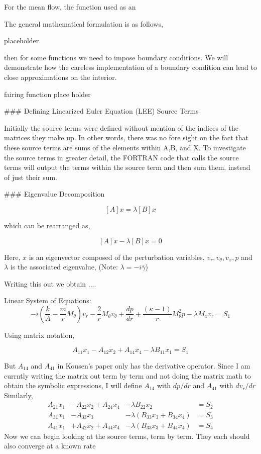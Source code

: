 For the mean flow, the function used as an

The general mathematical formulation is as follows,

placeholder

then for some functions we need to impose boundary conditions. We will demonstrate how the careless implementation of a boundary condition can lead to close approximations on the interior.

fairing function place holder 

### Defining Linearized Euler Equation (LEE) Source Terms

Initially the source terms were defined without mention of the indices of the matrices they make up. In other words, there was no fore sight on the fact that these source terms are sums 
of the elements within A,B, and X. To investigate the source terms in greater detail, the FORTRAN code that calls the source terms will output the terms within the source term and then sum them, instead of just their sum.

### Eigenvalue Decomposition


$$ [A]{x} = \lambda [B] {x} $$

which can be rearranged as,

$$ [A]{x} - \lambda [B] {x} = 0$$

Here, $x$ is an eigenvector composed of the perturbation variables, $v_r,v_{\theta},v_x,p$ and $\lambda$ is the associated eigenvalue, (Note: $\lambda = -i \bar{\gamma}$)

Writing this out we obtain ....

Linear System of Equations:
\begin{equation}
-
i \left(
\frac{k}{A} - \frac{m}{r} M_{\theta}
\right)
v_r 
-
\frac{2}{r} M_{\theta} v_{\theta} 
+
\frac{dp}{dr} 
+
\frac{(\kappa - 1)}{r} M_{\theta}^2 p
-
\lambda M_x v_r =S_1
\end{equation}

Using matrix notation,

\begin{equation}
A_{11}
x_1 
-
A_{12} x_2 
+
A_{14} x_4
-
\lambda B_{11} x_1 = S_1
\end{equation}

But $A_{14}$ and $A_{41}$ in Kousen's paper only has the derivative operator. Since I am currntly writing the matrix out term by term and not doing the matrix math to obtain the symbolic expressions, I will define $A_{14}$ with $dp/dr$ and $A_{41}$ with $dv_r/dr$
Similarly,
\begin{align}
A_{21} x_1 &-
A_{22} x_2 +
A_{24} x_4 &-
\lambda B_{22} x_2 &= S_2 \\
A_{31} x_1 &-
A_{33} x_3 &-
\lambda (B_{33} x_3 + B_{34} x_4) &= S_3\\
A_{41} x_1 &+
A_{42} x_2 +
A_{44} x_4 &- 
\lambda (B_{33} x_3 + B_{44} x_4) &= S_4
\end{align}
Now we can begin looking at the source terms, term by term. They each should also converge at a known rate